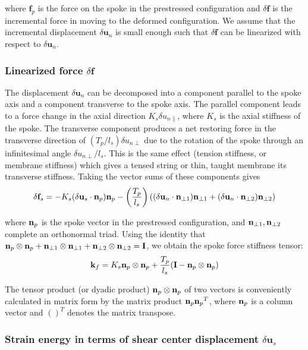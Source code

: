 \documentclass[\rootdir/thesis.tex]{subfiles}
\begin{document}
where $\mathbf{f}_p$ is the force on the spoke in the prestressed configuration and $\delta\mathbf{f}$ is the incremental force in moving to the deformed configuration. We assume that the incremental displacement $\delta\mathbf{u}_n$ is small enough such that $\delta\mathbf{f}$ can be linearized with respect to $\delta\mathbf{u}_n$.

\subsubsection{Linearized force $\delta\mathbf{f}$}

The displacement $\delta\mathbf{u}_n$ can be decomposed into a component parallel to the spoke axis and a component transverse to the spoke axis. The parallel component leads to a force change in the axial direction $K_s \delta u_{n\parallel}$, where $K_s$ is the axial stiffness of the spoke. The transverse component produces a net restoring force in the transverse direction of $(T_p/l_s) \delta u_{n\perp}$ due to the rotation of the spoke through an infinitesimal angle $\delta u_{n\perp}/l_s$. This is the same effect (tension stiffness, or membrane stiffness) which gives a tensed string or thin, taught membrane its transverse stiffness. Taking the vector sums of these components gives
\begin{equation}
\label{eq:fs_us}
\delta\mathbf{f}_s =
    -K_s (\delta\mathbf{u}_s \cdot {\mathbf{n}_p}){\mathbf{n}_p} -
    \left(\frac{T_p}{l_s}\right) \left((\delta\mathbf{u}_n \cdot \mathbf{n}_{\perp 1}) \mathbf{n}_{\perp 1} +
                                     (\delta\mathbf{u}_n \cdot \mathbf{n}_{\perp 2}) \mathbf{n}_{\perp 2} \right)
\end{equation}

where ${\mathbf{n}_p}$ is the spoke vector in the prestressed configuration, and $\mathbf{n}_{\perp 1},\mathbf{n}_{\perp 2}$ complete an orthonormal triad. Using the identity that ${\mathbf{n}_p}\otimes{\mathbf{n}_p} + \mathbf{n}_{\perp 1}\otimes\mathbf{n}_{\perp 1} + \mathbf{n}_{\perp 2}\otimes\mathbf{n}_{\perp 2} = \mathbf{I}$, we obtain the spoke force stiffness tensor:
\begin{equation}
\label{eq:kf}
\mathbf{k}_f = K_s {\mathbf{n}_p}\otimes{\mathbf{n}_p} + \frac{T_p}{l_s}(\mathbf{I} - {\mathbf{n}_p}\otimes{\mathbf{n}_p})
\end{equation}

The tensor product (or dyadic product) ${\mathbf{n}_p}\otimes{\mathbf{n}_p}$ of two vectors is conveniently calculated in matrix form by the matrix product ${\mathbf{n}_p}{\mathbf{n}_p}^T$, where ${\mathbf{n}_p}$ is a column vector  and $()^T$ denotes the matrix transpose.

\subsubsection{Strain energy in terms of shear center displacement $\delta\mathbf{u}_s$}
\end{document}
